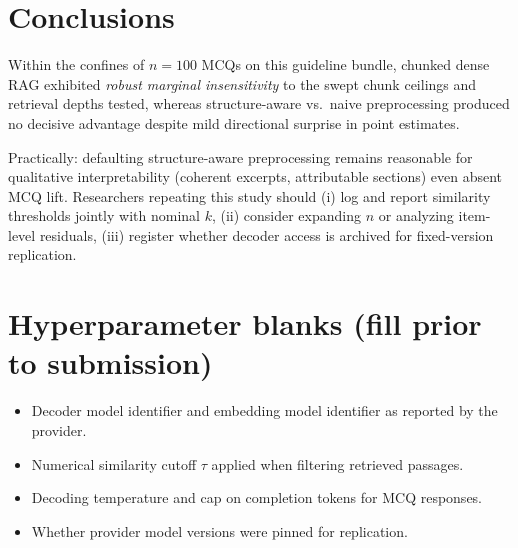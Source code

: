 \documentclass[11pt,a4paper]{article}
\begin{document}
\section{Conclusions}
Within the confines of \(n{=}100\) MCQs on this guideline bundle, chunked dense RAG exhibited \emph{robust marginal insensitivity} to the swept chunk ceilings and retrieval depths tested, whereas structure-aware vs.\ naive preprocessing produced no decisive advantage despite mild directional surprise in point estimates.

Practically: defaulting structure-aware preprocessing remains reasonable for qualitative interpretability (coherent excerpts, attributable sections) even absent MCQ lift. Researchers repeating this study should (i) log and report similarity thresholds jointly with nominal \(k\), (ii) consider expanding \(n\) or analyzing item-level residuals, (iii) register whether decoder access is archived for fixed-version replication.

\section*{Hyperparameter blanks (fill prior to submission)}
\begin{itemize}
\item Decoder model identifier and embedding model identifier as reported by the provider.
\item Numerical similarity cutoff \(\tau\) applied when filtering retrieved passages.
\item Decoding temperature and cap on completion tokens for MCQ responses.
\item Whether provider model versions were pinned for replication.
\end{itemize}
\end{document}
